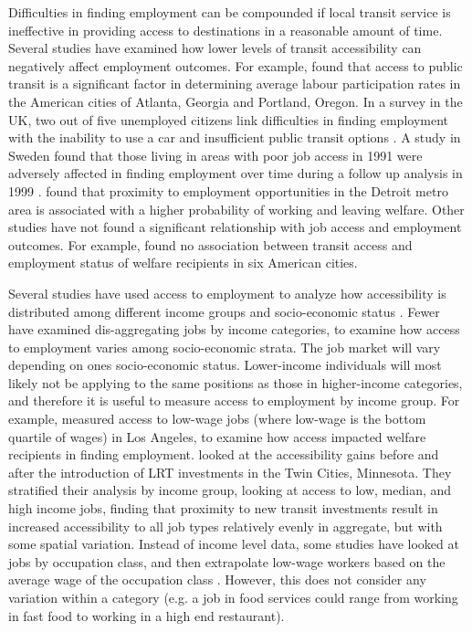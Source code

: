 \documentclass[11 pt, letterpaper]{article}
\begin{document}
{Difficulties in finding employment can be compounded if local transit service is ineffective in providing access to destinations in a reasonable amount of time. Several studies have examined how lower levels of transit accessibility can negatively affect employment outcomes. For example,  found that access to public transit is a significant factor in determining average labour participation rates in the American cities of Atlanta, Georgia and Portland, Oregon. In a survey in the UK, two out of five unemployed citizens link difficulties in finding employment with the inability to use a car and insufficient public transit options \cite{seu2003}. A study in Sweden found that those living in areas with poor job access in 1991 were adversely affected in finding employment over time during a follow up analysis in 1999 \cite{aaslund2009}.  found that proximity to employment opportunities in the Detroit metro area is associated with a higher probability of working and leaving welfare. Other studies have not found a significant relationship with job access and employment outcomes. For example,  found no association between transit access and employment status of welfare recipients in six American cities. 


Several studies have used access to employment to analyze how accessibility is distributed among different income groups and socio-economic status \cite{rau2012,foth2013}. Fewer have examined dis-aggregating jobs by income categories, to examine how access to employment varies among socio-economic strata. The job market will vary depending on ones socio-economic status. Lower-income individuals will most likely not be applying to the same positions as those in higher-income categories, and therefore it is useful to measure access to employment by income group. For example,  measured access to low-wage jobs (where low-wage is the bottom quartile of wages) in Los Angeles, to examine how access impacted welfare recipients in finding employment.  looked at the accessibility gains before and after the introduction of LRT investments in the Twin Cities, Minnesota. They stratified their analysis by income group, looking at access to low, median, and high income jobs, finding that proximity to new transit investments result in increased accessibility to all job types relatively evenly in aggregate, but with some spatial variation. Instead of income level data, some studies have looked at jobs by occupation class, and then extrapolate low-wage workers based on the average wage of the occupation class . However, this does not consider any variation within a category (e.g. a job in food services could range from working in fast food to working in a high end restaurant).

}
\end{document}
